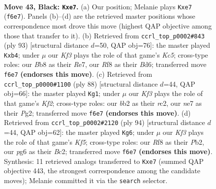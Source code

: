 \documentclass[11pt]{article}
\begin{document}
\clearpage

\begin{figure}[p]\centering
\begin{subfigure}{0.46\textwidth}\centering
\resizebox{\linewidth}{!}{%
\newchessgame
\chessboard[
  setfen={1b3r2/p3NN2/P4kP1/1P3p2/8/8/1B1K4/R7 b - - 6 43},
  showmover=false,
  pgfstyle=straightmove, color=movearrow, markmove={f6-e7}
]}
\caption{}
\end{subfigure}\hfill
\begin{subfigure}{0.46\textwidth}\centering
\resizebox{\linewidth}{!}{%
\newchessgame
\chessboard[
  setfen={8/4r3/3b4/2Np4/1PkP2p1/8/5PK1/2R5 b - - 7 47},
  showmover=false,
  pgfstyle=straightmove, color=movearrow, markmove={c4-b4}
]}
\caption{}
\end{subfigure}
\\[4pt]
\begin{subfigure}{0.46\textwidth}\centering
\resizebox{\linewidth}{!}{%
\newchessgame
\chessboard[
  setfen={8/5pk1/7p/8/4Rp2/1P2nB1P/2r2KP1/8 w - - 4 45},
  showmover=false,
  pgfstyle=straightmove, color=movearrow, markmove={f2-g1}
]}
\caption{}
\end{subfigure}\hfill
\begin{subfigure}{0.46\textwidth}\centering
\resizebox{\linewidth}{!}{%
\newchessgame
\chessboard[
  setfen={8/1pB5/p6n/3k1Kp1/4n3/1P2P3/1PB5/8 w - - 8 48},
  showmover=false,
  pgfstyle=straightmove, color=movearrow, markmove={f5-g6}
]}
\caption{}
\end{subfigure}
\caption{\textbf{Move 43, Black: \texttt{Kxe7}.} (a) Our position; Melanie plays \texttt{Kxe7} (\texttt{f6e7}). Panels (b)--(d) are the retrieved master positions whose correspondence most drove this move (highest QAP objective among those that transfer to it). (b) Retrieved from \texttt{ccrl\_top\_p0002\#843} (ply 93) [structural distance $d$=50, QAP obj=76]: the master played \texttt{Kxb4}; under $\mu$ our \emph{Kf3} plays the role of that game's \emph{Kc5}; cross-type roles: our \emph{B}b8 as their \emph{R}e7, our \emph{R}f8 as their \emph{B}d6; transferred move \texttt{f6e7} \textbf{(endorses this move)}. (c) Retrieved from \texttt{ccrl\_top\_p0000\#1100} (ply 88) [structural distance $d$=44, QAP obj=66]: the master played \texttt{Kg1}; under $\mu$ our \emph{Kf3} plays the role of that game's \emph{Kf2}; cross-type roles: our \emph{b}b2 as their \emph{r}c2, our \emph{n}e7 as their \emph{P}g2; transferred move \texttt{f6e7} \textbf{(endorses this move)}. (d) Retrieved from \texttt{ccrl\_top\_p0002\#2120} (ply 94) [structural distance $d$=44, QAP obj=62]: the master played \texttt{Kg6}; under $\mu$ our \emph{Kf3} plays the role of that game's \emph{Kf5}; cross-type roles: our \emph{R}f8 as their \emph{P}b2, our \emph{p}g6 as their \emph{B}c2; transferred move \texttt{f6e7} \textbf{(endorses this move)}. Synthesis: 11 retrieved analogs transferred to \texttt{Kxe7} (summed QAP objective 443, the strongest correspondence among the candidate moves); Melanie committed it via the \texttt{search} selector.}
\label{fig:thought-m85}
\end{figure}
\end{document}
